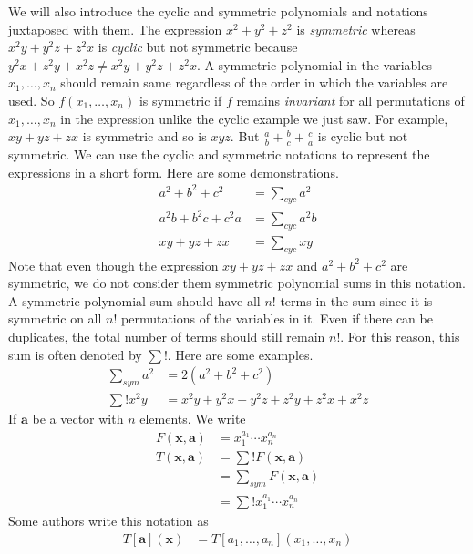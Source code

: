 \documentclass{subfile}
\begin{document}
	We will also introduce the cyclic and symmetric polynomials and notations juxtaposed with them. The expression $x^{2}+y^{2}+z^{2}$ is \textit{symmetric} whereas $x^{2}y+y^{2}z+z^{2}x$ is \textit{cyclic} but not symmetric because $y^{2}x+z^{2}y+x^{2}z\neq x^{2}y+y^{2}z+z^{2}x$. A symmetric polynomial in the variables $x_{1},\ldots,x_{n}$ should remain same regardless of the order in which the variables are used. So $f(x_{1},\ldots,x_{n})$ is symmetric if $f$ remains \textit{invariant} for all permutations of $x_{1},\ldots,x_{n}$ in the expression unlike the cyclic example we just saw. For example, $xy+yz+zx$ is symmetric and so is $xyz$. But $\frac{a}{b}+\frac{b}{c}+\frac{c}{a}$ is cyclic but not symmetric. We can use the cyclic and symmetric notations to represent the expressions in a short form. Here are some demonstrations.
		\begin{align*}
			a^{2}+b^{2}+c^{2}
				& = \sum_{cyc}a^{2}\\
			a^{2}b+b^{2}c+c^{2}a
				& = \sum_{cyc}a^{2}b\\
			xy+yz+zx
				& = \sum_{cyc}xy
		\end{align*}
	Note that even though the expression $xy+yz+zx$ and $a^{2}+b^{2}+c^{2}$ are symmetric, we do not consider them symmetric polynomial sums in this notation. A symmetric polynomial sum should have all $n!$ terms in the sum since it is symmetric on all $n!$ permutations of the variables in it. Even if there can be duplicates, the total number of terms should still remain $n!$. For this reason, this sum is often denoted by $\sum{!}$. Here are some examples.
		\begin{align*}
			\sum_{sym}a^{2}
				& = 2(a^{2}+b^{2}+c^{2})\\
			\sum{!} x^{2}y
				& = x^{2}y+y^{2}x+y^{2}z+z^{2}y+z^{2}x+x^{2}z
		\end{align*}
	If $\mathbf{a}$ be a vector with $n$ elements. We write
		\begin{align*}
			F(\mathbf{x}, \mathbf{a})
				& = x_{1}^{a_{1}}\cdots x_{n}^{a_{n}}\\
			T(\mathbf{x},\mathbf{a})
				& = \sum{!}F(\mathbf{x},\mathbf{a})\\
				& = \sum_{sym} F(\mathbf{x},\mathbf{a})\\
				& = \sum{!}x_{1}^{a_{1}}\cdots x_{n}^{a_{n}}
		\end{align*}
	Some authors write this notation as
		\begin{align*}
			T[\mathbf{a}](\mathbf{x})
				& = T[a_{1},\ldots,a_{n}](x_{1},\ldots,x_{n})
		\end{align*}
\end{document}
